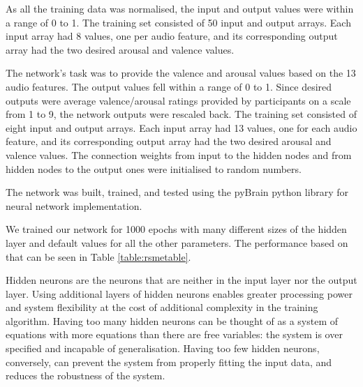 As all the training data was normalised, the input and output values were within a range of 0 to 1. The training set consisted of 50 input and output arrays. Each input array had 8 values, one per audio feature, and its corresponding output array had the two desired arousal and valence values.

The network’s task was to provide the valence and arousal values based on the 13 audio features. The output values fell within a range of 0 to 1. Since desired outputs were average valence/arousal ratings provided by participants on a scale from 1 to 9, the network outputs were rescaled back. The training set consisted of eight input and output arrays. Each input array had 13 values, one for each audio feature, and its corresponding output array had the two desired arousal and valence values. The connection weights from input to the hidden nodes and from hidden nodes to the output ones were initialised to random numbers. 

The network was built, trained, and tested using the pyBrain python library for neural network implementation. 

We trained our network for 1000 epochs with many different sizes of the hidden layer and default values for all the other parameters. The performance based on that can be seen in Table \ref{table:rsmetable}.


Hidden neurons are the neurons that are neither in the input layer nor the output layer. Using additional layers of hidden neurons enables greater processing power and system flexibility at the cost of additional complexity in the training algorithm. Having too many hidden neurons can be thought of as a system of equations with more equations than there are free variables: the system is over specified and incapable of generalisation. Having too few hidden neurons, conversely, can prevent the system from properly fitting the input data, and reduces the robustness of the system.

